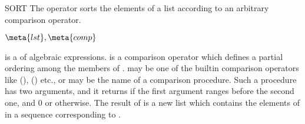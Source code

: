 \begin{Operator}{SORT}
The  operator sorts the elements of a list according to
an arbitrary comparison operator.
\begin{Syntax}
\(\meta{lst},\meta{comp}\)
\end{Syntax}
 is a  of algebraic expressions.
 is a comparison operator which defines a partial
ordering among the members of .   may be
one of the builtin comparison operators like 
\name{<}(), \name{<=}()
etc., or    may be the name of a comparison procedure.
Such a procedure has two arguments, and it returns 
 if the first argument
ranges before the second one, and 0 or  otherwise.
The result of  is a new list which contains the
elements of  in a sequence corresponding to .
\end{Operator}

